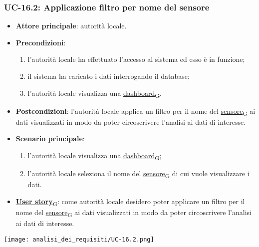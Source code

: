 \subsubsection{UC-16.2: Applicazione filtro per nome del sensore}
\begin{itemize}
	\item \textbf{Attore principale}: autorità locale.
	\item \textbf{Precondizioni}:
	      \begin{enumerate}
		      \item l'autorità locale ha effettuato l'accesso al sistema ed esso è in funzione;
		      \item il sistema ha caricato i dati interrogando il database;
		      \item l'autorità locale visualizza una \href{https://7last.github.io/docs/pb/documentazione-interna/glossario\#dashboard}{dashboard\textsubscript{G}}.
	      \end{enumerate}
	\item \textbf{Postcondizioni}: l'autorità locale applica un filtro per il nome del \href{https://7last.github.io/docs/pb/documentazione-interna/glossario\#sensore}{sensore\textsubscript{G}} ai dati visualizzati in modo da poter circoscrivere l'analisi ai dati di interesse.
	\item \textbf{Scenario principale}:
	      \begin{enumerate}
		      \item l'autorità locale visualizza una \href{https://7last.github.io/docs/pb/documentazione-interna/glossario\#dashboard}{dashboard\textsubscript{G}};
		      \item l'autorità locale seleziona il nome del \href{https://7last.github.io/docs/pb/documentazione-interna/glossario\#sensore}{sensore\textsubscript{G}} di cui vuole visualizzare i dati.
	      \end{enumerate}
	\item \href{https://7last.github.io/docs/pb/documentazione-interna/glossario\#user-story}{\textbf{User story}\textsubscript{G}}:
	      come autorità locale desidero poter applicare un filtro per il nome del \href{https://7last.github.io/docs/pb/documentazione-interna/glossario\#sensore}{sensore\textsubscript{G}} ai dati visualizzati in modo da poter circoscrivere l'analisi ai dati di interesse.
\end{itemize}
\begin{center}
	\texttt{[image: analisi\_dei\_requisiti/UC-16.2.png]}
\end{center}

